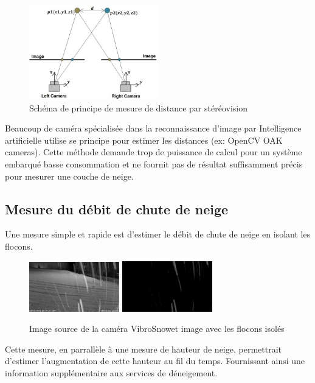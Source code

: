 \begin{figure}[H]
    \centering
    \includegraphics[width=0.5\textwidth]{Images/computer_vision/stereovision.jpg}
    \caption[Schéma de principe stéréovision]{Schéma de principe de mesure de distance par stéréovision}
    \label{fig:Stereovision}
\end{figure}
\noindent
Beaucoup de caméra spécialisée dans la reconnaissance d'image par Intelligence artificielle utilise se principe
pour estimer les distances (ex: OpenCV OAK cameras).
Cette méthode demande trop de puissance de calcul pour un système embarqué basse consommation et ne fournit
pas de résultat suffisamment précis pour mesurer une couche de neige.
\newpage

\subsection{Mesure du débit de chute de neige}
Une mesure simple et rapide est d'estimer le débit de chute de neige en isolant les flocons.
\begin{figure}[H]
    \centering
    \includegraphics[width=0.35\textwidth]{Images/computer_vision/snow_cam.png}
    \includegraphics[width=0.35\textwidth]{Images/computer_vision/snowfall.png}
    \caption[Comparaison image source et bruit sur image]{Image source de la caméra VibroSnow\footnotemark[1] et image avec les flocons isolés}
    \label{fig:Snowfall}
\end{figure}
\noindent
Cette mesure, en parrallèle à une mesure de hauteur de neige, permettrait d'estimer 
l'augmentation de cette hauteur au fil du temps. Fournissant ainsi une information supplémentaire
aux services de déneigement.

